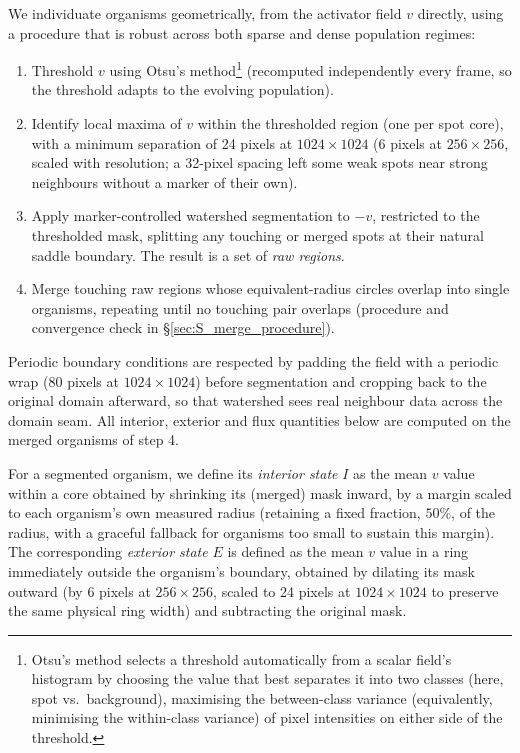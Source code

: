 \documentclass[11pt]{article}
\begin{document}
We individuate organisms geometrically, from the activator field $v$ directly, using a procedure that is robust across both sparse and dense population regimes:
\begin{enumerate}
\item Threshold $v$ using Otsu's method\footnote{Otsu's method \citep{Otsu1979} selects a threshold automatically from a scalar field's histogram by choosing the value that best separates it into two classes (here, spot vs.\ background), maximising the between-class variance (equivalently, minimising the within-class variance) of pixel intensities on either side of the threshold.} (recomputed independently every frame, so the threshold adapts to the evolving population).
\item Identify local maxima of $v$ within the thresholded region (one per spot core), with a minimum separation of 24 pixels at $1024\times1024$ (6 pixels at $256\times256$, scaled with resolution; a 32-pixel spacing left some weak spots near strong neighbours without a marker of their own).
\item Apply marker-controlled watershed segmentation to $-v$, restricted to the thresholded mask, splitting any touching or merged spots at their natural saddle boundary. The result is a set of \emph{raw regions}.
\item Merge touching raw regions whose equivalent-radius circles overlap into single organisms, repeating until no touching pair overlaps (procedure and convergence check in \S\ref{sec:S_merge_procedure}).
\end{enumerate}
Periodic boundary conditions are respected by padding the field with a periodic wrap (80 pixels at $1024\times1024$) before segmentation and cropping back to the original domain afterward, so that watershed sees real neighbour data across the domain seam. All interior, exterior and flux quantities below are computed on the merged organisms of step 4.

For a segmented organism, we define its \emph{interior state} $I$ as the mean $v$ value within a core obtained by shrinking its (merged) mask inward, by a margin scaled to each organism's own measured radius (retaining a fixed fraction, $50\%$, of the radius, with a graceful fallback for organisms too small to sustain this margin). The corresponding \emph{exterior state} $E$ is defined as the mean $v$ value in a ring immediately outside the organism's boundary, obtained by dilating its mask outward (by 6 pixels at $256\times256$, scaled to 24 pixels at $1024\times1024$ to preserve the same physical ring width) and subtracting the original mask.
\end{document}
